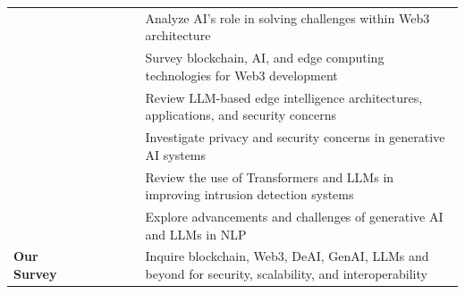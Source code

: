 \documentclass[5p,twocolumn]{elsarticle}
\begin{document}
\begin{table}[!t]
\begin{tabularx}{\linewidth}{>{\hsize}Z>{\hsize}Z>{\hsize}Z>{\hsize}Z>{\hsize}Z>{\hsize}Z>{\hsize}X}
\cite{shen2024artificial} &  &  &  &  &  & Analyze AI's role in solving challenges within Web3 architecture \\

\cite{zhu2024survey} &  &  &  &  &  & Survey blockchain, AI, and edge computing technologies for Web3 development \\\midrule

\cite{friha2024llm} &  &  &  &  &  & Review LLM-based edge intelligence architectures, applications, and security concerns \\

\cite{golda2024privacy} &  &  &  &  &  & Investigate privacy and security concerns in generative AI systems \\

\cite{kheddar2024transformers} &  &  &  &  &  & Review the use of Transformers and LLMs in improving intrusion detection systems \\

\cite{hagos2024recent} &  &  &  &  &  & Explore advancements and challenges of generative AI and LLMs in NLP \\\midrule

\textbf{Our Survey} &  &  &  &  &  & Inquire blockchain, Web3, DeAI, GenAI, LLMs and beyond for \newline security, scalability, and interoperability \\\bottomrule

\end{tabularx}
\end{table}
\end{document}
